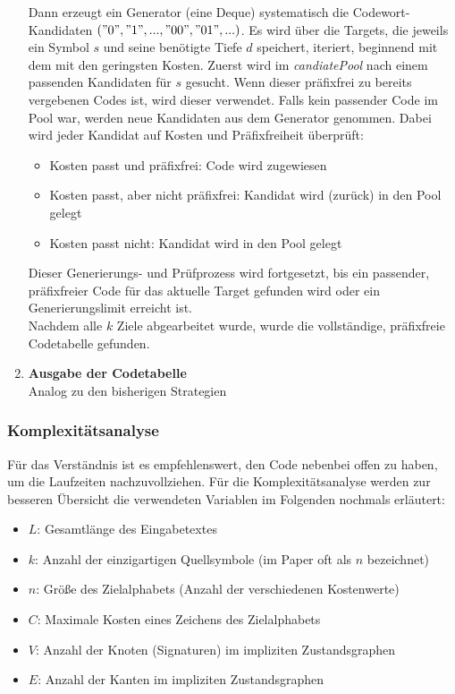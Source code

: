 \documentclass[a4paper,10pt,ngerman]{scrartcl}
\begin{document}
\begin{enumerate}
  Dann erzeugt ein Generator (eine Deque) systematisch die Codewort-Kandidaten $("0", "1", ..., "00",\\ "01", ...)$. Es wird über die Targets, die jeweils ein Symbol $s$ und seine benötigte Tiefe $d$ speichert, iteriert, beginnend mit dem mit den geringsten Kosten. Zuerst wird im \textit{candiatePool} nach einem passenden Kandidaten für $s$ gesucht. Wenn dieser präfixfrei zu bereits vergebenen Codes ist, wird dieser verwendet. Falls kein passender Code im Pool war, werden neue Kandidaten aus dem Generator genommen. Dabei wird jeder Kandidat auf Kosten und Präfixfreiheit überprüft: 
  \begin{itemize}
    \item Kosten passt und präfixfrei: Code wird zugewiesen 
    \item Kosten passt, aber nicht präfixfrei: Kandidat wird (zurück) in den Pool gelegt 
    \item Kosten passt nicht: Kandidat wird in den Pool gelegt 
  \end{itemize}
  Dieser Generierungs- und Prüfprozess wird fortgesetzt, bis ein passender, präfixfreier Code für das aktuelle Target gefunden wird oder ein Generierungslimit erreicht ist. 
  \\\newline
  Nachdem alle $k$ Ziele abgearbeitet wurde, wurde die vollständige, präfixfreie Codetabelle gefunden. 
  \item \textbf{Ausgabe der Codetabelle} \\
  Analog zu den bisherigen Strategien
  
\end{enumerate}

\subsubsection{Komplexitätsanalyse}
Für das Verständnis ist es empfehlenswert, den Code nebenbei offen zu haben, um die Laufzeiten nachzuvollziehen. Für die Komplexitätsanalyse werden zur besseren Übersicht die verwendeten Variablen im Folgenden nochmals erläutert:
\begin{itemize}
  \item $L$: Gesamtlänge des Eingabetextes
  \item $k$: Anzahl der einzigartigen Quellsymbole (im Paper oft als $n$ bezeichnet)
  \item $n$: Größe des Zielalphabets (Anzahl der verschiedenen Kostenwerte)
  \item $C$: Maximale Kosten eines Zeichens des Zielalphabets
  \item $V$: Anzahl der Knoten (Signaturen) im impliziten Zustandsgraphen
  \item $E$: Anzahl der Kanten im impliziten Zustandsgraphen
\end{itemize}
\end{document}

